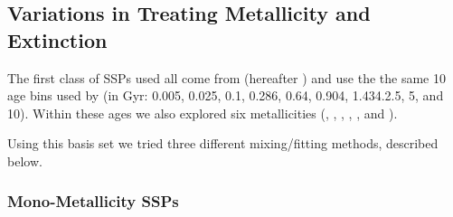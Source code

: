 


\subsection{Variations in Treating Metallicity and
  Extinction}
\label{891_2:sec:bc03_SSP}
The first class of SSPs used all come from \citet{Bruzual03}
(hereafter ) and use the the same 10 age bins
used by \citet{Tremonti04} (in Gyr: 0.005, 0.025, 0.1, 0.286, 0.64,
0.904, 1.434.2.5, 5, and 10).  Within these ages we also explored six
metallicities (, ,
, , , and
).

Using this basis set we tried three different mixing/fitting methods,
described below.

\subsubsection{Mono-Metallicity SSPs}
\label{891_2:sec:mono_metal}

